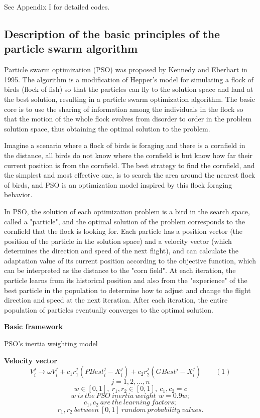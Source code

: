 \documentclass[twocolumn]{article}
\begin{document}
See Appendix I for detailed codes.

\subsection{Description of the basic principles of the particle
swarm
algorithm}


Particle swarm optimization (PSO) was proposed by Kennedy and Eberhart
in 1995. The algorithm is a modification of Hepper's model for
simulating a flock of birds (flock of fish) so that the particles can
fly to the solution space and land at the best solution, resulting in a
particle swarm optimization algorithm. The basic core is to use the
sharing of information among the individuals in the flock so that the
motion of the whole flock evolves from disorder to order in the problem
solution space, thus obtaining the optimal solution to the problem.

Imagine a scenario where a flock of birds is foraging and there is a
cornfield in the distance, all birds do not know where the cornfield is
but know how far their current position is from the cornfield. The best
strategy to find the cornfield, and the simplest and most effective one,
is to search the area around the nearest flock of birds, and PSO is an
optimization model inspired by this flock foraging behavior.

In PSO, the solution of each optimization problem is a bird in the
search space, called a "particle", and the optimal solution of the
problem corresponds to the cornfield that the flock is looking for. Each
particle has a position vector (the position of the particle in the
solution space) and a velocity vector (which determines the direction
and speed of the next flight), and can calculate the adaptation value of
its current position according to the objective function, which can be
interpreted as the distance to the "corn field". At each iteration, the
particle learns from its historical position and also from the
"experience" of the best particle in the population to determine how to
adjust and change the flight direction and speed at the next iteration.
After each iteration, the entire population of particles eventually
converges to the optimal solution.

\textbf{Basic framework}

PSO's inertia weighting model

\textbf{Velocity vector}
\[V_{i}^j\to \omega V_{i}^j + c_1r_1^j(PBest_{i}^j - X_{i}^j)+c_2r_2^j(GBest^j-X_i^j)\qquad(1)\]
\[j=1,2,...,n\]
\[w\in[0,1],\ r_1,r_2\in[0,1],\ c_1,c_2=c\]
\[w\ is\ the\ PSO\ inertia\ weight\,\ w=0.9w;\]
\[c_1,c_2\ are\ the\ learning\ factors;\]
\[r_1,r_2\ between\ [0,1]\ random\ probability\ values.\]
\end{document}
